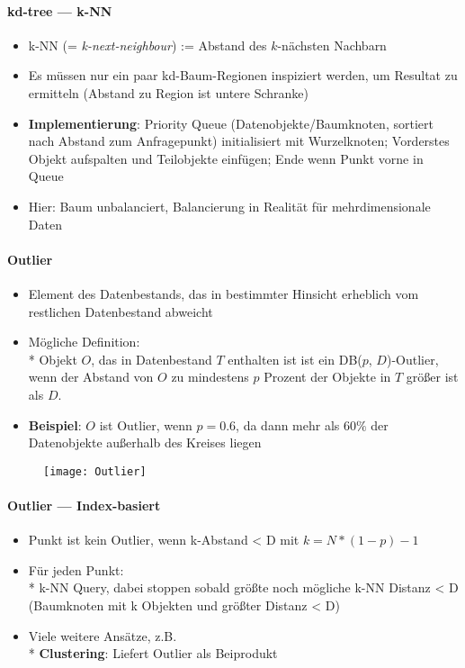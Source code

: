 \paragraph{kd-tree --- k-NN}
\begin{itemize}
	\item k-NN (= \emph{k-next-neighbour}) := Abstand des \( k \)-nächsten Nachbarn
	\item Es müssen nur ein paar kd-Baum-Regionen inspiziert werden, um Resultat zu ermitteln (Abstand zu Region ist untere Schranke)
	\item \textbf{Implementierung}: Priority Queue (Datenobjekte/Baumknoten, sortiert nach Abstand zum Anfragepunkt) initialisiert mit Wurzelknoten; Vorderstes Objekt aufspalten und Teilobjekte einfügen; Ende wenn Punkt vorne in Queue
	\item Hier: Baum unbalanciert, Balancierung in Realität für mehrdimensionale Daten
\end{itemize}

\paragraph{Outlier}
\begin{itemize}
	\item Element des Datenbestands, das in bestimmter Hinsicht erheblich vom restlichen Datenbestand abweicht
	\item Mögliche Definition: \\*
		Objekt \( O \), das in Datenbestand \( T \) enthalten ist ist ein DB(\( p \), \( D \))-Outlier, wenn der Abstand von \( O \) zu mindestens \( p \) Prozent der Objekte in \( T \) größer ist als \( D \).
	\item \textbf{Beispiel}: \( O \) ist Outlier, wenn \( p=0.6 \), da dann mehr als \( 60\% \) der Datenobjekte außerhalb des Kreises liegen
\end{itemize}
\begin{figure}[H]\centering\label{Outlier}\texttt{[image: Outlier]}\end{figure}

\paragraph{Outlier --- Index-basiert}
\begin{itemize}
	\item Punkt ist kein Outlier, wenn k-Abstand < D mit $k = N * (1 - p) - 1$
	\item Für jeden Punkt:\\*
		k-NN Query, dabei stoppen sobald größte noch mögliche k-NN Distanz < D  (Baumknoten mit k Objekten und größter Distanz < D)
	\item Viele weitere Ansätze, z.B. \\*
		\textbf{Clustering}: Liefert Outlier als Beiprodukt
\end{itemize}



